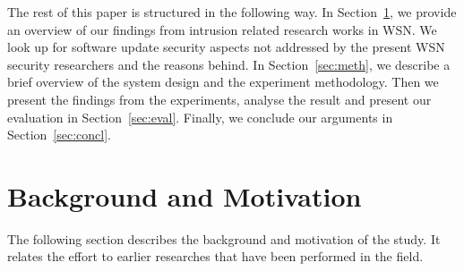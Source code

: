 \documentclass[conference,final]{IEEEtran}
\newcommand{\notedme}[1]{\raisebox{0pt}[0pt][0pt]{\pdfcomment[open=true,color=blue]{#1}}}
\begin{document}
The rest of this paper is structured in the following way. 
In Section~\ref{sec:lit}, we provide an overview of our findings from intrusion related research works in WSN. 
We look up for  software update security aspects not addressed by the present WSN security researchers and the reasons behind. 
In Section~\ref{sec:meth}, we describe a brief overview of the system  design and the experiment methodology. 
Then we  present the findings from the experiments, analyse the result and present our evaluation in Section~\ref{sec:eval}.  
Finally, we conclude our arguments in Section~\ref{sec:concl}.

\section{Background and Motivation}
\label{sec:lit}

The following section describes the background and motivation of the study.  It relates the effort to earlier researches that have been performed in the field.
\end{document}
